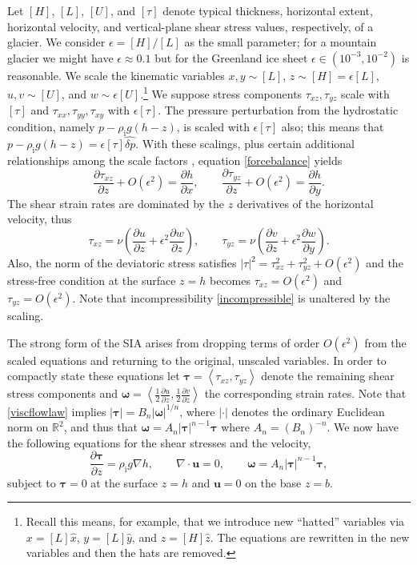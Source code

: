 \documentclass[letterpaper,final,12pt,reqno]{amsart}
\newcommand{\eps}{\epsilon}
\newcommand{\RR}{\mathbb{R}}
\newcommand{\grad}{\nabla}
\newcommand{\Div}{\nabla\cdot}
\newcommand{\bu}{\mathbf{u}}
\newcommand{\rhoi}{\rho_{\text{i}}}
\begin{document}
Let $[H]$, $[L]$, $[U]$, and $[\tau]$ denote typical thickness, horizontal extent, horizontal velocity, and vertical-plane shear stress values, respectively, of a glacier.  We consider $\eps = [H]/[L]$ as the small parameter; for a mountain glacier we might have $\eps \approx 0.1$ but for the Greenland ice sheet $\eps \in (10^{-3},10^{-2})$ is reasonable.  We scale the kinematic variables $x,y \sim [L]$, $z \sim [H] = \eps [L]$, $u,v \sim [U]$, and $w \sim \eps [U]$.\footnote{Recall this means, for example, that we introduce new ``hatted'' variables via $x=[L]\hat x$, $y=[L]\hat y$, and $z=[H] \hat z$.  The equations are rewritten in the new variables and then the hats are removed.}  We suppose stress components $\tau_{xz},\tau_{yz}$ scale with $[\tau]$ and $\tau_{xx},\tau_{yy},\tau_{xy}$ with $\eps[\tau]$.   The pressure perturbation from the hydrostatic condition, namely $p-\rhoi g (h - z)$, is scaled with $\eps [\tau]$ also; this means that $p-\rhoi g (h - z)=\eps[\tau]\hat{\delta p}$.  With these scalings, plus certain additional relationships among the scale factors \cite{Fowler1997}, equation \eqref{forcebalance} yields
    $$\frac{\partial\tau_{xz}}{\partial z} + O(\eps^2) = \frac{\partial h}{\partial x}, \qquad \frac{\partial\tau_{yz}}{\partial z} + O(\eps^2) = \frac{\partial h}{\partial y}.$$
The shear strain rates are dominated by the $z$ derivatives of the horizontal velocity, thus
    $$\tau_{xz} = \nu\left(\frac{\partial u}{\partial z} + \eps^2 \frac{\partial w}{\partial z}\right), \qquad \tau_{yz} = \nu\left(\frac{\partial v}{\partial z} + \eps^2 \frac{\partial w}{\partial y}\right).$$
Also, the norm of the deviatoric stress satisfies $|\tau|^2 = \tau_{xz}^2 + \tau_{yz}^2 + O(\eps^2)$ and the stress-free condition at the surface $z=h$ becomes $\tau_{xz} = O(\eps^2)$ and $\tau_{yz} = O(\eps^2)$.  Note that incompressibility \eqref{incompressible} is unaltered by the scaling.

The strong form of the SIA arises from dropping terms of order $O(\eps^2)$ from the scaled equations and returning to the original, unscaled variables.  In order to compactly state these equations let $\bm{\tau}=\left<\tau_{xz},\tau_{yz}\right>$ denote the remaining shear stress components and $\bm{\omega}=\left<\frac{1}{2} \frac{\partial u}{\partial z},\frac{1}{2} \frac{\partial v}{\partial z}\right>$ the corresponding strain rates.  Note that \eqref{viscflowlaw} implies $|\bm{\tau}|=B_n |\bm{\omega}|^{1/n}$, where $|\cdot|$ denotes the ordinary Euclidean norm on $\RR^2$, and thus that $\bm{\omega} = A_n |\bm{\tau}|^{n-1} \bm{\tau}$ where $A_n=(B_n)^{-n}$.  We now have the following equations for the shear stresses and the velocity,
\begin{equation}
\frac{\partial\bm{\tau}}{\partial z} = \rhoi g \grad h, \qquad \Div \bu = 0, \qquad \bm{\omega} = A_n |\bm{\tau}|^{n-1} \bm{\tau}, \label{siavectorized}
\end{equation}
subject to $\bm{\tau}=0$ at the surface $z=h$ and $\bu=0$ on the base $z=b$.
\end{document}
